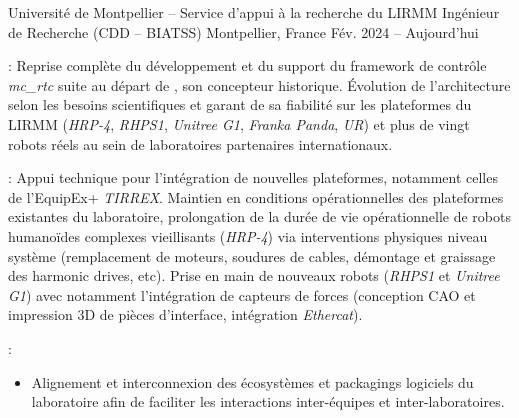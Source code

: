 
\begin{cventries}
\cventry
    {Université de Montpellier -- Service d'appui à la recherche du LIRMM} %
    {Ingénieur de Recherche (CDD -- BIATSS)} %
    {Montpellier, France} %
    {Fév. 2024 -- Aujourd'hui} %
    {
      \begin{cvitems} %
        \item {} : Reprise complète du développement et du support du framework de contrôle \emph{mc\_rtc} suite au départ de , son concepteur historique. Évolution de l'architecture selon les besoins scientifiques et garant de sa fiabilité sur les plateformes du LIRMM (\emph{HRP-4}, \emph{RHPS1}, \emph{Unitree G1}, \emph{Franka Panda}, \emph{UR}) et plus de vingt robots réels au sein de laboratoires partenaires internationaux.
        \item {} : Appui technique pour l'intégration de nouvelles plateformes, notamment celles de l'EquipEx+ \emph{TIRREX}. Maintien en conditions opérationnelles des plateformes existantes du laboratoire, prolongation de la durée de vie opérationnelle de robots humanoïdes complexes vieillisants (\emph{HRP-4}) via interventions physiques niveau système (remplacement de moteurs, soudures de cables, démontage et graissage des harmonic drives, etc). Prise en main de nouveaux robots (\emph{RHPS1} et \emph{Unitree G1}) avec notamment l'intégration de capteurs de forces (conception CAO et impression 3D de pièces d'interface, intégration \emph{Ethercat}).
        \item {} :
          \begin{itemize}
          \item Alignement et interconnexion des écosystèmes et packagings logiciels du laboratoire afin de faciliter les interactions inter-équipes et inter-laboratoires.

\end{itemize}
\end{cvitems}}
\end{cventries}
